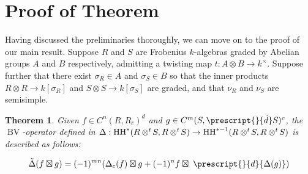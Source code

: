 \documentclass{article}
\newcommand{\HH}{\operatorname{HH}}
\newcommand{\twisten}{\otimes^t\hspace{-1pt}}
\newcommand{\bv}{\operatorname{BV}}
\theoremstyle{plain}
\newtheorem{theorem}{Theorem}
\theoremstyle{definition}
\begin{document}
\section{Proof of Theorem}
Having discussed the preliminaries thoroughly, we can move on to the proof of our main result. Suppose $R$ and $S$ are Frobenius $k$-algebras graded by Abelian groups $A$ and $B$ respectively, admitting a twisting map $t:A \otimes B \rightarrow k^\times$. Suppose further that there exist $\sigma_R \in A$ and $\sigma_S \in B$ so that the inner products $R \otimes R \rightarrow k[\sigma_R]$ and $S \otimes S \rightarrow k[\sigma_S]$ are graded, and that $\nu_R$ and $\nu_S$ are semisimple.
\begin{theorem} Given $f \in C^n(R, R_{\hat{c}})^d$ and $g \in C^m(S, \prescript{}{\hat{d}}S)^c$, the $\bv$-operator defined in \cite{Lambre} $\Delta:\HH^*(R \twisten S, R \twisten S) \rightarrow \HH^{*-1}(R \twisten S, R \twisten S)$ is described as follows:

$$\tilde{\Delta}(f\boxtimes g) =  (-1)^{mn}(\Delta_c(f) \boxtimes g +(-1)^{n} f \boxtimes \; \prescript{}{d}{\Delta(g)})$$
\end{theorem}
\hspace{10pt}
\end{document}
